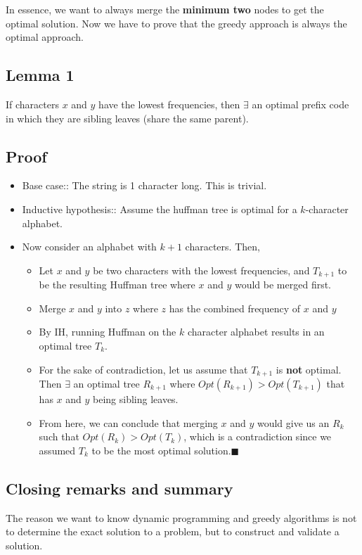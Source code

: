 \documentclass[12pt]{book}
\begin{document}
In essence, we want to always merge the \textbf{minimum two} nodes to get the optimal solution. Now we have to prove that the greedy approach is always the optimal approach.

\subsection*{Lemma 1}

If characters $x$ and $y$ have the lowest frequencies, then $\exists$ an optimal prefix code in which they are sibling leaves (share the same parent).

\subsection*{Proof}

\begin{itemize}
    \item Base case:: The string is 1 character long. This is trivial.
    \item Inductive hypothesis:: Assume the huffman tree is optimal for a $k$-character alphabet.
    \item Now consider an alphabet with $k+1$ characters. Then,
    \begin{itemize}
        \item Let $x$ and $y$ be two characters with the lowest frequencies, and $T_{k+1}$ to be the resulting Huffman tree where $x$ and $y$ would be merged first.
        \item Merge $x$ and $y$ into $z$ where $z$ has the combined frequency of $x$ and $y$
        \item By IH, running Huffman on the $k$ character alphabet results in an optimal tree $T_k$.
        \item For the sake of contradiction, let us assume that $T_{k+1}$ is \textbf{not} optimal. Then $\exists$ an optimal tree $R_{k+1}$ where $Opt(R_{k+1})>Opt(T_{k+1})$ that has $x$ and $y$ being sibling leaves.
        \item From here, we can conclude that merging $x$ and $y$ would give us an $R_k$ such that $Opt(R_k)>Opt(T_k)$, which is a contradiction since we assumed $T_k$ to be the most optimal solution.$\blacksquare$
    \end{itemize}
\end{itemize}

\subsection*{Closing remarks and summary}

The reason we want to know dynamic programming and greedy algorithms is not to determine the exact solution to a problem, but to construct and validate a solution.
\end{document}
